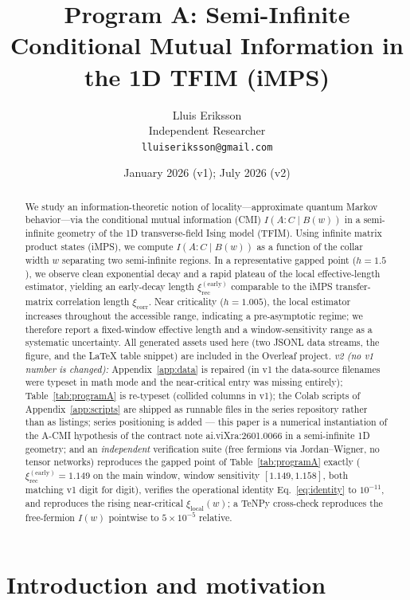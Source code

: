 \documentclass[11pt]{article}
\title{Program A: Semi-Infinite Conditional Mutual Information in the 1D
TFIM (iMPS)}
\author{Lluis Eriksson\\
\small Independent Researcher\\
\small \texttt{lluiseriksson@gmail.com}}
\date{January 2026 (v1); July 2026 (v2)}
\begin{document}
\maketitle

\begin{abstract}
We study an information-theoretic notion of locality---approximate
quantum Markov behavior---via the conditional mutual information (CMI)
$I(A : C \mid B(w))$ in a semi-infinite geometry of the 1D
transverse-field Ising model (TFIM). Using infinite matrix product
states (iMPS), we compute $I(A : C \mid B(w))$ as a function of the
collar width $w$ separating two semi-infinite regions. In a
representative gapped point ($h = 1.5$), we observe clean exponential
decay and a rapid plateau of the local effective-length estimator,
yielding an early-decay length $\xi^{(\mathrm{early})}_{\mathrm{rec}}$
comparable to the iMPS transfer-matrix correlation length
$\xi_{\mathrm{corr}}$. Near criticality ($h = 1.005$), the local
estimator increases throughout the accessible range, indicating a
pre-asymptotic regime; we therefore report a fixed-window effective
length and a window-sensitivity range as a systematic uncertainty. All
generated assets used here (two JSONL data streams, the figure, and the
LaTeX table snippet) are included in the Overleaf project. \emph{v2 (no
v1 number is changed):} Appendix~\ref{app:data} is repaired (in v1 the
data-source filenames were typeset in math mode and the near-critical
entry was missing entirely); Table~\ref{tab:programA} is re-typeset
(collided columns in v1); the Colab scripts of Appendix~\ref{app:scripts}
are shipped as runnable files in the series repository rather than as
listings; series positioning is added --- this paper is a numerical
instantiation of the A-CMI hypothesis of the contract note
ai.viXra:2601.0066 in a semi-infinite 1D geometry; and an
\emph{independent} verification suite (free fermions via Jordan--Wigner,
no tensor networks) reproduces the gapped point of
Table~\ref{tab:programA} exactly ($\xi^{(\mathrm{early})}_{\mathrm{rec}}
= 1.149$ on the main window, window sensitivity $[1.149, 1.158]$, both
matching v1 digit for digit), verifies the operational identity
Eq.~\eqref{eq:identity} to $10^{-11}$, and reproduces the rising
near-critical $\xi_{\mathrm{local}}(w)$; a TeNPy cross-check reproduces
the free-fermion $I(w)$ pointwise to $5\times10^{-5}$ relative.
\end{abstract}

\section{Introduction and motivation}
\end{document}

